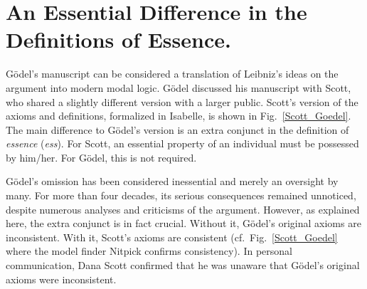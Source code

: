 \documentclass{llncs}
\begin{document}
\section{An Essential Difference in the Definitions of Essence.}
\label{sec:history}
G\"odel's manuscript can be considered a translation of Leibniz's
ideas on the argument into modern modal logic. G\"odel
discussed his manuscript with Scott, who shared a slightly different
version with a larger public. Scott's version of the axioms and
definitions, formalized in Isabelle, is shown in
Fig.~\ref{Scott_Goedel}. 
The main difference to G\"odel's version is an
extra conjunct in the definition of \emph{essence} (\emph{ess}). For Scott,
an essential property of an individual must be possessed by
him/her. For G\"odel, this is not required. 


G\"odel's omission has been
considered inessential and merely an oversight by many. 
For more than four decades, its serious consequences remained unnoticed, 
despite numerous analyses and criticisms of the
argument.
However, as explained here, the extra conjunct is in
fact crucial. Without it, G\"odel's original axioms are
inconsistent. With it, Scott's axioms are consistent (cf.~Fig.~\ref{Scott_Goedel}
where the model finder Nitpick \cite{Nitpick} confirms consistency). In
personal communication, Dana Scott confirmed that he was unaware
that G\"odel's original axioms were inconsistent.




\end{document}
